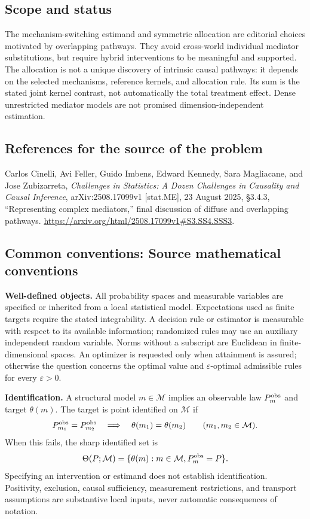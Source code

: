 \documentclass[11pt,a4paper]{article}
\begin{document}
\subsection*{Scope and status}
The mechanism-switching estimand and symmetric allocation are editorial choices motivated by overlapping pathways. They avoid cross-world individual mediator substitutions, but require hybrid interventions to be meaningful and supported. The allocation is not a unique discovery of intrinsic causal pathways: it depends on the selected mechanisms, reference kernels, and allocation rule. Its sum is the stated joint kernel contrast, not automatically the total treatment effect. Dense unrestricted mediator models are not promised dimension-independent estimation.
\subsection*{References for the source of the problem}
Carlos Cinelli, Avi Feller, Guido Imbens, Edward Kennedy, Sara Magliacane, and Jose Zubizarreta, \emph{Challenges in Statistics: A Dozen Challenges in Causality and Causal Inference}, arXiv:2508.17099v1 [stat.ME], 23 August 2025, \S3.4.3, ``Representing complex mediators,'' final discussion of diffuse and overlapping pathways. \url{https://arxiv.org/html/2508.17099v1#S3.SS4.SSS3}.

\subsection*{Common conventions: Source mathematical conventions}

\textbf{Well-defined objects.}
All probability spaces and measurable variables are specified or inherited
from a local statistical model. Expectations used as finite targets require
the stated integrability. A decision rule or estimator is measurable with
respect to its available information; randomized rules may use an auxiliary
independent random variable. Norms without a subscript are Euclidean in
finite-dimensional spaces. An optimizer is requested only when attainment
is assured; otherwise the question concerns the optimal value and
$\varepsilon$-optimal admissible rules for every $\varepsilon>0$.

\textbf{Identification.}
A structural model $m\in\mathcal M$ implies an observable law
$P_m^{\rm obs}$ and target $\theta(m)$. The target is point identified on
$\mathcal M$ if
\[
 P_{m_1}^{\rm obs}=P_{m_2}^{\rm obs}
 \quad\Longrightarrow\quad\theta(m_1)=\theta(m_2)
 \qquad(m_1,m_2\in\mathcal M).
\]
When this fails, the sharp identified set is
\[
 \Theta(P;\mathcal M)=\{\theta(m):m\in\mathcal M,
                                  P_m^{\rm obs}=P\}.
\]
Specifying an intervention or estimand does not establish identification.
Positivity, exclusion, causal sufficiency, measurement restrictions, and
transport assumptions are substantive local inputs, never automatic
consequences of notation.
\end{document}
